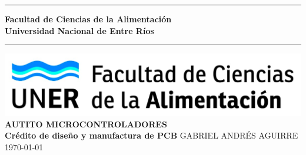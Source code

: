 \documentclass[12pt]{article}
\begin{document}
\begin{titlepage}
\begin{center}
\vspace*{2\baselineskip}
\hrule height 3pt
\vspace*{0.5\baselineskip}
{\Huge \textbf{Facultad de Ciencias de la Alimentación}}\\
[0.1cm]
{\large \textbf{Universidad Nacional de Entre Ríos}}
\vspace*{0.5\baselineskip}
\hrule
\vspace*{10\baselineskip}
\includegraphics[scale=0.35]{src/institucion/Logo_fcal-1174x247.png}
\vspace*{2\baselineskip}
\textbf{\\AUTITO MICROCONTROLADORES\\}
\textbf{Crédito de diseño y manufactura de PCB}
\vfill
GABRIEL ANDRÉS AGUIRRE \\
\today
\end{center}
\end{titlepage}
\end{document}
